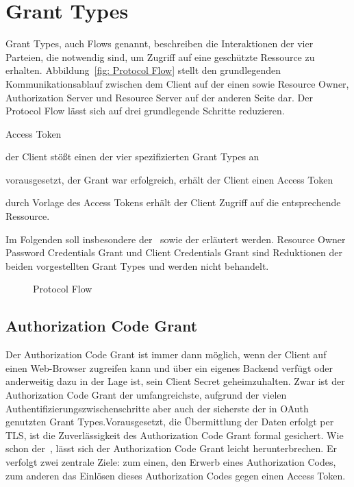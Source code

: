\section{\glspl{Grant Type}}\label{GrantTypes} \glspl{Grant Type}, auch Flows
genannt, beschreiben die Interaktionen der vier Parteien, die notwendig sind, um
Zugriff auf eine geschützte Ressource zu erhalten. Abbildung~\ref{fig: Protocol
Flow} stellt den grundlegenden Kommunikationsablauf zwischen dem Client auf der
einen sowie Resource Owner, Authorization Server und Resource Server auf der
anderen Seite dar. Der Protocol Flow lässt sich auf drei grundlegende Schritte
reduzieren.


\begin{labeling}{Access Token}
    \item [Authorization Grant] der Client stößt einen der vier spezifizierten
    \glspl{Grant Type} an
    \item [Access Token Retrieval] vorausgesetzt, der Grant war erfolgreich,
    erhält der Client einen Access Token
    \item [Ressource Access] durch Vorlage des Access Tokens erhält der Client
    Zugriff auf die entsprechende Ressource.
\end{labeling} Im Folgenden soll insbesondere der~ sowie
der  erläutert werden. Resource Owner Password
Credentials Grant und Client Credentials Grant sind Reduktionen der beiden
vorgestellten \glspl{Grant Type} und werden nicht behandelt.

\begin{figure}[h]
    \scalebox{.6} {
        
    }
    \caption{Protocol Flow}\label{fig: Protocol Flow}
\end{figure} 

\subsection{Authorization Code Grant}\label{ssec:authcode}  Der Authorization Code Grant ist immer dann möglich, wenn der
Client auf einen Web-Browser zugreifen kann und über ein eigenes Backend verfügt
oder anderweitig dazu in der Lage ist, sein Client Secret  geheimzuhalten. Zwar
ist der Authorization Code Grant der umfangreichste, aufgrund der vielen
Authentifizierungszwischenschritte aber auch der sicherste der in \gls{OAuth}
genutzten \glspl{Grant Type}.Vorausgesetzt, die Übermittlung der Daten erfolgt
per \gls{TLS}, ist die Zuverlässigkeit des Authorization Code Grant formal
gesichert.\cite{Chari.2011} Wie schon der~, lässt
sich der Authorization Code Grant leicht herunterbrechen. Er verfolgt zwei
zentrale Ziele: zum einen, den Erwerb eines Authorization Codes, zum anderen das
Einlösen dieses Authorization Codes gegen einen Access Token.

